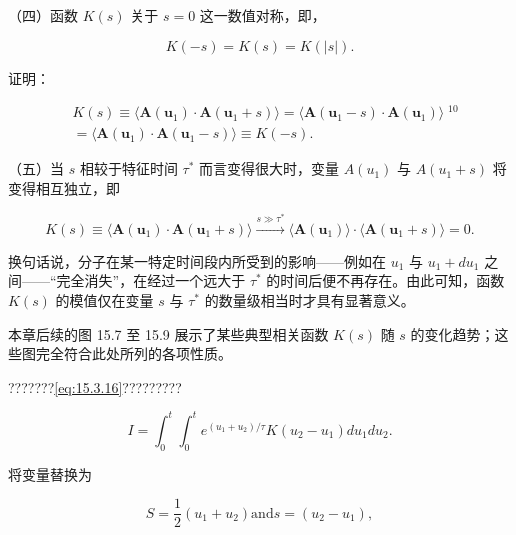 （四）函数 \(K(s)\) 关于 \(s=0\) 这一数值对称，即，

\begin{equation}\tag{15.3.21}\label{eq:15.3.21}
K ( - s ) = K ( s ) = K ( | s | ) .
\end{equation}

证明：

\begin{equation}\tag{15.3.22}\label{eq:15.3.22}
\begin{array}{rl} & { K ( s ) \equiv \langle \pmb { A } ( \pmb { u } _ { 1 } ) \cdot \pmb { A } ( \pmb { u } _ { 1 } + s ) \rangle = \langle \pmb { A } ( \pmb { u } _ { 1 } - s ) \cdot \pmb { A } ( \pmb { u } _ { 1 } ) \rangle \; ^{10} } \\& {  = \langle \pmb { A } ( \pmb { u } _ { 1 } ) \cdot \pmb { A } ( \pmb { u } _ { 1 } - s ) \rangle \equiv K ( - s ) . } \end{array}
\end{equation}

（五）当 \(s\) 相较于特征时间 \(\tau^{*}\) 而言变得很大时，变量 \(A(u_{1})\) 与 \(A(u_{1}+s)\) 将变得相互独立，即

\begin{equation}\tag{15.3.23}\label{eq:15.3.23}
K ( s ) \equiv \langle \pmb { A } ( \pmb { u } _ { 1 } ) \cdot \pmb { A } ( \pmb { u } _ { 1 } + s ) \rangle \xrightarrow { s \gg \tau ^{*} } \langle \pmb { A } ( \pmb { u } _ { 1 } ) \rangle \cdot \langle \pmb { A } ( \pmb { u } _ { 1 } + s ) \rangle = 0 .
\end{equation}

换句话说，分子在某一特定时间段内所受到的影响------例如在 \(u_{1}\) 与 \(u_{1}+du_{1}\) 之间------``完全消失''，在经过一个远大于 \(\tau^{*}\) 的时间后便不再存在。由此可知，函数 \(K(s)\) 的模值仅在变量 \(s\) 与 \(\tau^{*}\) 的数量级相当时才具有显著意义。

本章后续的图 15.7 至 15.9 展示了某些典型相关函数 \(K(s)\) 随 \(s\) 的变化趋势；这些图完全符合此处所列的各项性质。

???????\autoref{eq:15.3.16}?????????

\begin{equation}\tag{15.3.24}\label{eq:15.3.24}
I = \int _ { 0 } ^{t} \int _ { 0 } ^{t} e ^{( u _ { 1} + u _ { 2 } ) / \tau } K ( u _ { 2 } - u _ { 1 } ) d u _ { 1 } d u _ { 2 } .
\end{equation}

将变量替换为

\begin{equation}\tag{15.3.25}\label{eq:15.3.25}
S = \frac { 1 } { 2 } ( u _ { 1 } + u _ { 2 } )  \mathrm { a n d }  s = ( u _ { 2 } - u _ { 1 } ) ,
\end{equation}

